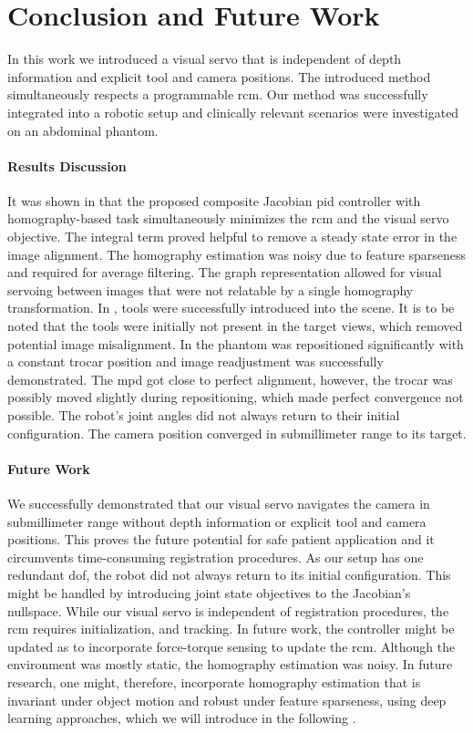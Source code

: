 \section{Conclusion and Future Work}
\label{c2:sec:conclusions}
In this work we introduced a visual servo that is independent of depth information and explicit tool and camera positions. The introduced method simultaneously respects a programmable \gls{rcm}. Our method was successfully integrated into a robotic setup and clinically relevant scenarios were investigated on an abdominal phantom.

\paragraph{Results Discussion} It was shown in  that the proposed composite Jacobian \gls{pid} controller with homography-based task simultaneously minimizes the \gls{rcm} and the visual servo objective. The integral term proved helpful to remove a steady state error in the image alignment. The homography estimation was noisy due to feature sparseness and required for average filtering. The graph representation allowed for visual servoing between images that were not relatable by a single homography transformation. In , tools were successfully introduced into the scene. It is to be noted that the tools were initially not present in the target views, which removed potential image misalignment. In  the phantom was repositioned significantly with a constant trocar position and image readjustment was successfully demonstrated. The \gls{mpd} got close to perfect alignment, however, the trocar was possibly moved slightly during repositioning, which made perfect convergence not possible. The robot's joint angles did not always return to their initial configuration. The camera position converged in submillimeter range to its target.

\paragraph{Future Work} We successfully demonstrated that our visual servo navigates the camera in submillimeter range without depth information or explicit tool and camera positions. This proves the future potential for safe patient application and it circumvents time-consuming registration procedures. As our setup has one redundant \gls{dof}, the robot did not always return to its initial configuration. This might be handled by introducing joint state objectives to the Jacobian's nullspace. While our visual servo is independent of registration procedures, the \gls{rcm} requires initialization, and tracking. In future work, the controller might be updated as to incorporate force-torque sensing to update the \gls{rcm}. Although the environment was mostly static, the homography estimation was noisy. In future research, one might, therefore, incorporate homography estimation that is invariant under object motion and robust under feature sparseness, using deep learning approaches, which we will introduce in the following .
